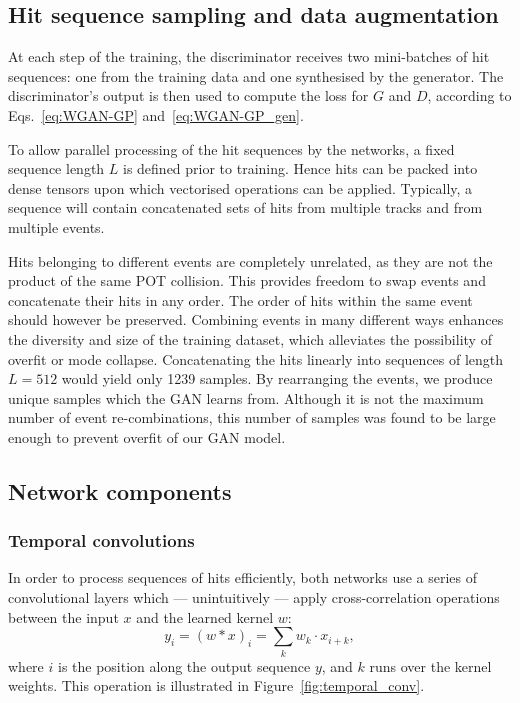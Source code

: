 

\subsection{Hit sequence sampling and data augmentation}
At each step of the training, the discriminator receives two mini-batches of hit
sequences: one from the training data and one synthesised by the generator. The
discriminator's output is then used to compute the loss for $G$ and $D$,
according to Eqs.~\ref{eq:WGAN-GP} and~\ref{eq:WGAN-GP_gen}.

To allow parallel processing of the hit sequences by the networks, a fixed
sequence length $L$ is defined prior to training. Hence hits can be packed
into dense tensors upon which vectorised operations can be applied. Typically, a
sequence will contain concatenated sets of hits from multiple tracks and from
multiple events.

Hits belonging to different events are completely unrelated, as they are not the
product of the same POT collision. This provides freedom to swap events and
concatenate their hits in any order. The order of hits within the same event
should however be preserved. 
Combining events in many different ways enhances the diversity and size of the
training dataset, which alleviates the possibility of overfit or mode collapse.
Concatenating the  hits linearly into sequences of length
$L=512$ would yield only 1239 samples. By rearranging the events, we produce
 unique samples which the GAN learns from. Although it is not
the maximum number of event re-combinations, this number of samples was found to
be large enough to prevent overfit of our GAN model.


\subsection{Network components}

\subsubsection{Temporal convolutions}
In order to process sequences of hits efficiently, both networks use a series of
convolutional layers which --- unintuitively --- apply cross-correlation
operations between the input $x$ and the learned kernel $w$:
\begin{equation}\label{eq:conv1d}
    y_{i} = (w \ast x)_{i} = \sum_{k} w_k \cdot x_{i+k},
\end{equation}
where $i$ is the position along the output sequence $y$, and $k$ runs over the
kernel weights. This operation is illustrated in Figure~\ref{fig:temporal_conv}.

